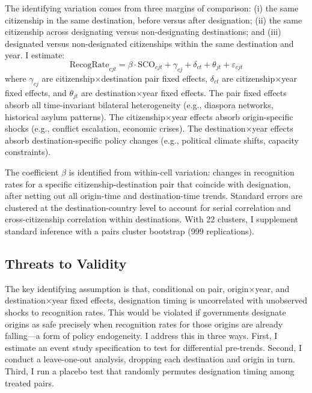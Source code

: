 \documentclass[12pt]{article}
\begin{document}
The identifying variation comes from three margins of comparison: (i) the same citizenship in the same destination, before versus after designation; (ii) the same citizenship across designating versus non-designating destinations; and (iii) designated versus non-designated citizenships within the same destination and year. I estimate:
\begin{equation}
\text{RecogRate}_{cjt} = \beta \cdot \text{SCO}_{cjt} + \gamma_{cj} + \delta_{ct} + \theta_{jt} + \varepsilon_{cjt}
\label{eq:main}
\end{equation}
where $\gamma_{cj}$ are citizenship$\times$destination pair fixed effects, $\delta_{ct}$ are citizenship$\times$year fixed effects, and $\theta_{jt}$ are destination$\times$year fixed effects. The pair fixed effects absorb all time-invariant bilateral heterogeneity (e.g., diaspora networks, historical asylum patterns). The citizenship$\times$year effects absorb origin-specific shocks (e.g., conflict escalation, economic crises). The destination$\times$year effects absorb destination-specific policy changes (e.g., political climate shifts, capacity constraints).

The coefficient $\beta$ is identified from within-cell variation: changes in recognition rates for a specific citizenship-destination pair that coincide with designation, after netting out all origin-time and destination-time trends. Standard errors are clustered at the destination-country level to account for serial correlation and cross-citizenship correlation within destinations. With 22 clusters, I supplement standard inference with a pairs cluster bootstrap (999 replications).

\subsection{Threats to Validity}

The key identifying assumption is that, conditional on pair, origin$\times$year, and destination$\times$year fixed effects, designation timing is uncorrelated with unobserved shocks to recognition rates. This would be violated if governments designate origins as safe precisely when recognition rates for those origins are already falling---a form of policy endogeneity. I address this in three ways. First, I estimate an event study specification to test for differential pre-trends. Second, I conduct a leave-one-out analysis, dropping each destination and origin in turn. Third, I run a placebo test that randomly permutes designation timing among treated pairs.
\end{document}
